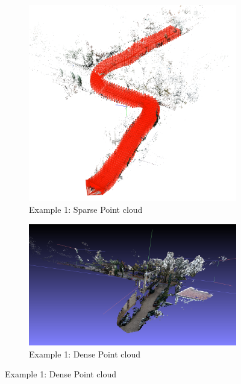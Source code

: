 \documentclass[11pt]{article}
\begin{document}
    \begin{figure}
        \centering
        \begin{subfigure}{0.45\textwidth}
            \centering
            \includegraphics[width=\linewidth]{images/method/sfm_sparse_1}
            \caption{Example 1: Sparse Point cloud}
        \end{subfigure}
        \hfill
        \begin{subfigure}{0.45\textwidth}
            \centering
            \includegraphics[width=\linewidth]{images/method/sfm_dense_1}
            \caption{Example 1: Dense Point cloud}
        \end{subfigure}


\end{figure}
\end{document}
